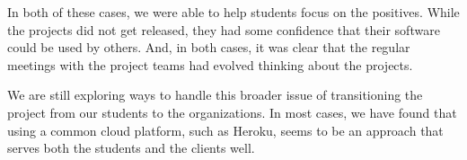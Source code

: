 In both of these cases, we were able to help students focus on the
positives.  While the projects did not get released, they had some
confidence that their software could be used by others.  And, in
both cases, it was clear that the regular meetings with the project
teams had evolved thinking about the projects.

We are still exploring ways to handle this broader issue of
transitioning the project from our students to the organizations.
In most cases, we have found that using a common cloud platform,
such as Heroku, seems to be an approach that serves both the students
and the clients well.


